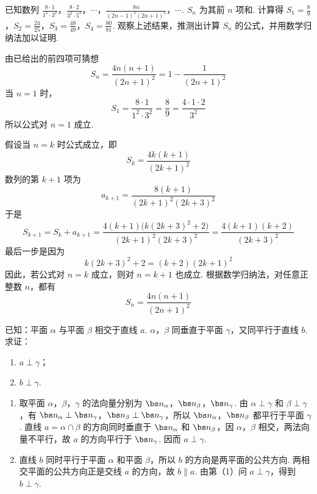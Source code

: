 \documentclass[UTF8,a4paper,oneside,11pt]{ctexbook}
\begin{document}
\begin{problem}
已知数列 \(\frac{8\cdot 1}{1^2\cdot 3^2}\)，\(\frac{8\cdot 2}{3^2\cdot 5^2}\)，\(\cdots\)，\(\frac{8n}{(2n-1)^2(2n+1)^2}\)，\(\cdots\). \(S_n\) 为其前 \(n\) 项和. 计算得 \(S_1=\frac{8}{9}\)，\(S_2=\frac{24}{25}\)，\(S_3=\frac{48}{49}\)，\(S_4=\frac{80}{81}\). 观察上述结果，推测出计算 \(S_n\) 的公式，并用数学归纳法加以证明.
\end{problem}

\begin{solution}
由已给出的前四项可猜想
\[
S_n=\frac{4n(n+1)}{(2n+1)^2}=1-\frac{1}{(2n+1)^2}
\]
当 \(n=1\) 时，
\[
S_1=\frac{8\cdot1}{1^2\cdot3^2}=\frac{8}{9}=\frac{4\cdot1\cdot2}{3^2}
\]
所以公式对 \(n=1\) 成立.

假设当 \(n=k\) 时公式成立，即
\[
S_k=\frac{4k(k+1)}{(2k+1)^2}
\]
数列的第 \(k+1\) 项为
\[
a_{k+1}=\frac{8(k+1)}{(2k+1)^2(2k+3)^2}
\]
于是
\[
S_{k+1}=S_k+a_{k+1}
=\frac{4(k+1)\bigl(k(2k+3)^2+2\bigr)}{(2k+1)^2(2k+3)^2}
=\frac{4(k+1)(k+2)}{(2k+3)^2}
\]
最后一步是因为
\[
k(2k+3)^2+2=(k+2)(2k+1)^2
\]
因此，若公式对 \(n=k\) 成立，则对 \(n=k+1\) 也成立. 根据数学归纳法，对任意正整数 \(n\)，都有
\[
\boxed{S_n=\frac{4n(n+1)}{(2n+1)^2}}
\]
\end{solution}

\begin{problem}
已知：平面 \(\alpha\) 与平面 \(\beta\) 相交于直线 \(a\). \(\alpha\)，\(\beta\) 同垂直于平面 \(\gamma\)，又同平行于直线 \(b\). 求证：

\begin{enumerate}
\item \(a\perp\gamma\)；
\item \(b\perp\gamma\).
\end{enumerate}
\end{problem}

\begin{solution}
\begin{enumerate}
\item 取平面 \(\alpha\)，\(\beta\)，\(\gamma\) 的法向量分别为 \(\bs n_\alpha\)，\(\bs n_\beta\)，\(\bs n_\gamma\). 由 \(\alpha\perp\gamma\) 和 \(\beta\perp\gamma\)，有 \(\bs n_\alpha\perp\bs n_\gamma\)，\(\bs n_\beta\perp\bs n_\gamma\)，所以 \(\bs n_\alpha\)，\(\bs n_\beta\) 都平行于平面 \(\gamma\). 直线 \(a=\alpha\cap\beta\) 的方向同时垂直于 \(\bs n_\alpha\) 和 \(\bs n_\beta\)，因 \(\alpha\)，\(\beta\) 相交，两法向量不平行，故 \(a\) 的方向平行于 \(\bs n_\gamma\). 因而 \(a\perp\gamma\).

\item 直线 \(b\) 同时平行于平面 \(\alpha\) 和平面 \(\beta\)，所以 \(b\) 的方向是两平面的公共方向. 两相交平面的公共方向正是交线 \(a\) 的方向，故 \(b\parallel a\). 由第（1）问 \(a\perp\gamma\)，得到 \(b\perp\gamma\).
\end{enumerate}
\end{solution}
\end{document}
